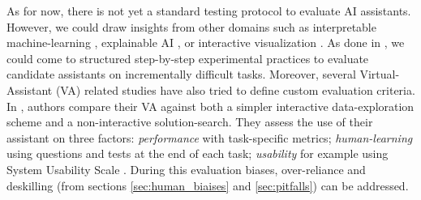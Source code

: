 \documentclass{IOS-Book-Article}
\begin{document}
 As for now, there is not yet a standard testing protocol to evaluate AI assistants. However, we could draw insights from other domains such as interpretable machine-learning \cite{doshi2017towards}, explainable AI \cite{pruthi2020evaluating, rosenfeld2021better}, or interactive visualization \cite{Borgo2018InformationVE}. As done in \cite{doshi2017towards}, we could come to structured step-by-step experimental practices to evaluate candidate assistants on incrementally difficult tasks.
 Moreover, several Virtual-Assistant (VA) related studies have also tried to define custom evaluation criteria. In \cite{martin2020daphne}, authors compare their VA against both a simpler interactive data-exploration scheme and a non-interactive solution-search. They assess the use of their assistant on three factors: \textit{performance} with task-specific metrics; \textit{human-learning} using questions and tests at the end of each task; \textit{usability}  for example using System Usability Scale \cite{Brooke1996SUSA}. During this evaluation biases, over-reliance and deskilling (from sections \ref{sec:human_biaises} and \ref{sec:pitfalls}) can be addressed.

\end{document}
